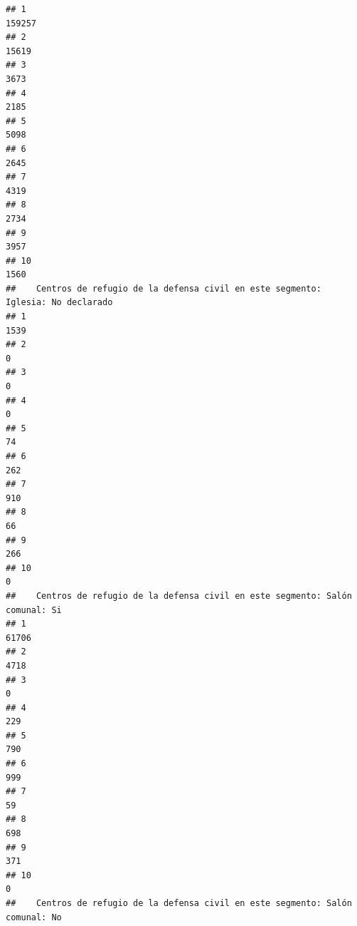 \documentclass[11pt,]{article}
\begin{document}
\begin{verbatim}
## 1                                                                159257
## 2                                                                 15619
## 3                                                                  3673
## 4                                                                  2185
## 5                                                                  5098
## 6                                                                  2645
## 7                                                                  4319
## 8                                                                  2734
## 9                                                                  3957
## 10                                                                 1560
##    Centros de refugio de la defensa civil en este segmento: Iglesia: No declarado
## 1                                                                            1539
## 2                                                                               0
## 3                                                                               0
## 4                                                                               0
## 5                                                                              74
## 6                                                                             262
## 7                                                                             910
## 8                                                                              66
## 9                                                                             266
## 10                                                                              0
##    Centros de refugio de la defensa civil en este segmento: Salón comunal: Si
## 1                                                                       61706
## 2                                                                        4718
## 3                                                                           0
## 4                                                                         229
## 5                                                                         790
## 6                                                                         999
## 7                                                                          59
## 8                                                                         698
## 9                                                                         371
## 10                                                                          0
##    Centros de refugio de la defensa civil en este segmento: Salón comunal: No

\end{verbatim}
\end{document}
